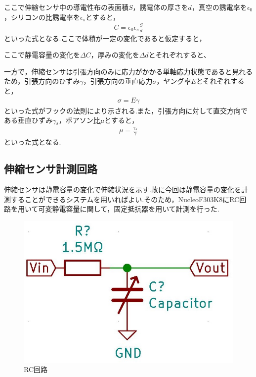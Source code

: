 ここで伸縮センサ中の導電性布の表面積$S$，誘電体の厚さを$d$，真空の誘電率を$\epsilon{}_0$，シリコンの比誘電率を$\epsilon{}_s$とすると，
\begin{eqnarray}
    C=\epsilon{}_0\epsilon{}_s\frac{S}{d}
\end{eqnarray}
といった式となる.ここで体積が一定の変化であると仮定すると， 

ここで静電容量の変化を$\Delta{}C$，厚みの変化を$\Delta{}d$とそれぞれすると、

一方で，伸縮センサは引張方向のみに応力がかかる単軸応力状態であると見れるため，引張方向のひずみ$\gamma$，引張方向の垂直応力$\sigma$，ヤング率$E$とそれぞれすると，
\begin{eqnarray}
    \sigma=E\gamma
    \label{フックの法則}
\end{eqnarray}
といった式がフックの法則により示される.また，引張方向に対して直交方向である垂直ひずみ$\gamma{}_s$，ポアソン比$\mu$とすると，
\begin{eqnarray}
    \mu = \frac{\gamma{}_s}{\gamma}
    \label{ポアソン比}
\end{eqnarray}
といった式となる.

\subsection{伸縮センサ計測回路}
伸縮センサは静電容量の変化で伸縮状況を示す.故に今回は静電容量の変化を計測することができるシステムを用いればよい.そのため，NucleoF303K8にRC回路を用いて可変静電容量に関して，固定抵抗器を用いて計測を行った.

\begin{figure}[h]
 \begin{center}
  \includegraphics[width=0.75\columnwidth,clip,bb=0 0 515 347]{Photo/2.実験方法/RC.JPG}
  \caption{RC回路}
  \label{RC}
 \end{center}
\end{figure}

